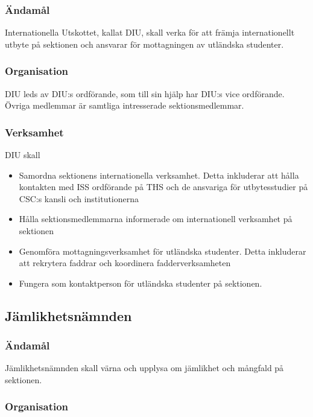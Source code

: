 \documentclass{dgovdoc}
\begin{document}
\subsubsection{Ändamål}

Internationella Utskottet, kallat DIU, skall verka för att främja
internationellt utbyte på sektionen och ansvarar för mottagningen av utländska
studenter.

\subsubsection{Organisation}

DIU leds av DIU:s ordförande, som till sin hjälp har DIU:s vice ordförande.
Övriga medlemmar är samtliga intresserade sektionsmedlemmar.

\subsubsection{Verksamhet}

DIU skall

\begin{itemize}
  \item Samordna sektionens internationella verksamhet. Detta inkluderar att
    hålla kontakten med ISS ordförande på THS och de ansvariga för
    utbytesstudier på CSC:s kansli och institutionerna
  \item Hålla sektionsmedlemmarna informerade om internationell verksamhet på
    sektionen
  \item Genomföra mottagningsverksamhet för utländska studenter. Detta
    inkluderar att rekrytera faddrar och koordinera fadderverksamheten
  \item Fungera som kontaktperson för utländska studenter på sektionen.
\end{itemize}

\subsection{Jämlikhetsnämnden}

\subsubsection{Ändamål}

Jämlikhetsnämnden skall värna och upplysa om jämlikhet och mångfald på
sektionen.

\subsubsection{Organisation}
\end{document}
